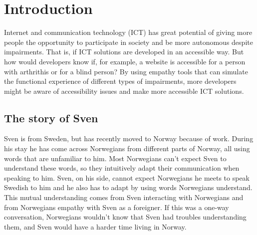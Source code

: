 

\chapter{Introduction}

Internet and communication technology (ICT) has great potential of giving more people the opportunity to participate in society and be more autonomous despite impairments. That is, if ICT solutions are developed in an accessible way. But how would developers know if, for example, a website is accessible for a person with arthrithis or for a blind person? By using empathy tools that can simulate the functional experience of different types of impairments, more developers might be aware of accessibility issues and make more accessible ICT solutions.


\section{The story of Sven}
Sven is from Sweden, but has recently moved to Norway because of work. During his stay he has come across Norwegians from different parts of Norway, all using words that are unfamiliar to him. Most Norwegians can't expect Sven to understand these words, so they intuitively adapt their communication when speaking to him. Sven, on his side, cannot expect Norwegians he meets to speak Swedish to him and he also has to adapt by using words Norwegians understand. This mutual understanding comes from Sven interacting with Norwegians and from Norwegians empathy with Sven as a foreigner. If this was a one-way conversation, Norwegians wouldn't know that Sven had troubles understanding them, and Sven would have a harder time living in Norway.

